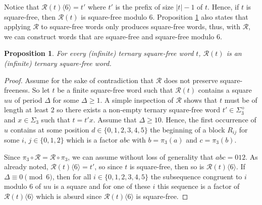\documentclass[12pt]{article}
\newtheorem{proposition}[theorem]{Proposition}
\theoremstyle{definition}
\newcommand{\subsequence}[2]{#1\langle#2\rangle}
\begin{document}
Notice that $\subsequence{\mathcal{R}(t)}{6} = t'$ where $t'$ is the prefix of size $|t| - 1$ of $t$. Hence, if $t$ is square-free, then $\mathcal{R}(t)$ is square-free modulo $6$. Proposition \ref{prop:6-compl-sqfree} also states that applying $\mathcal{R}$ to square-free words only produces square-free words, thus, with $\mathcal{R}$, we can construct words that are square-free and square-free modulo $6$.
\begin{proposition}\label{prop:6-compl-sqfree}
    For every (infinite) ternary square-free word $t$, $\mathcal{R}(t)$ is an (infinite) ternary square-free word.
\end{proposition}

\begin{proof}
    Assume for the sake of contradiction that $\mathcal{R}$ does not preserve square-freeness. So let $t$ be a finite square-free word such that $\mathcal{R}(t)$ contains a square $uu$ of period $\Delta$ for some $\Delta \geq 1$. A simple inspection of $\mathcal{R}$ shows that $t$ must be of length at least $2$ so there exists a non-empty ternary square-free word $t' \in \Sigma_3^+$ and $x \in \Sigma_3$ such that $t = t'x$.
    Assume that $\Delta \ge 10$. Hence, the first occurrence of $u$ contains at some position $d\in\{0,1,2,3,4,5\}$ the beginning of a block $R_{ij}$ for some $i$, $j \in \{0, 1, 2\}$ which is a factor $abc$ with $b = \pi_3(a)$ and $c = \pi_3(b)$.

    Since $\pi_3\circ\mathcal{R} = \mathcal{R}\circ\pi_3$, we can assume without loss of generality that $abc = 012$. As already noted, $\subsequence{\mathcal{R}(t)}{6} = t'$, so since $t$ is square-free, then so is $\subsequence{\mathcal{R}(t)}{6}$. If $\Delta \equiv 0 \pmod6$, then for all $i \in \{0, 1, 2, 3, 4, 5\}$ the subsequence congruent to $i$ modulo $6$ of $uu$ is a square and for one of these $i$ this sequence is a factor of $\subsequence{\mathcal{R}(t)}{6}$ which is absurd since $\subsequence{\mathcal{R}(t)}{6}$ is square-free.
    

\end{proof}
\end{document}
